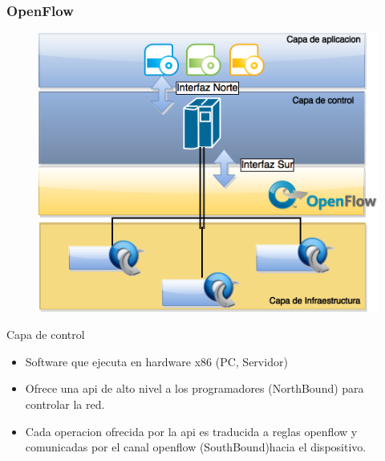 \documentclass{beamer}
\begin{document}
\begin{frame}
\frametitle{OpenFlow} 
\begin{minipage}{0.50\textwidth}
	\begin{figure}[H]
		\raggedright
		\includegraphics[width=1.0\textwidth, right]{imagenes/openflowFull.png}
	\end{figure}

\end{minipage}
\hfill
\begin{minipage}{0.49\textwidth}
Capa de control
\begin{itemize}
\item   Software que ejecuta en hardware x86 (PC, Servidor)
\item   Ofrece una api de alto nivel a los programadores (NorthBound) para controlar la red.
\item  Cada operacion ofrecida por la api es traducida a reglas openflow y comunicadas por el canal openflow (SouthBound)hacia el dispositivo.
\end{itemize}


\end{minipage}

\end{frame}
\end{document}
